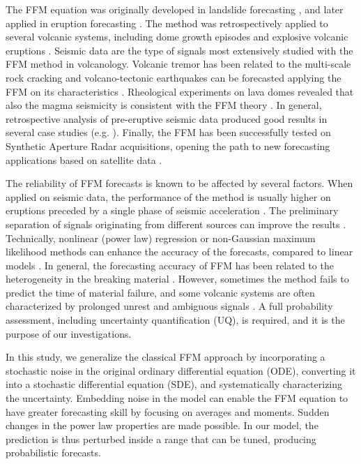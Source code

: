 \documentclass{article}
\begin{document}
The FFM equation was originally developed in landslide forecasting \citep{Fukuzuno1985, Voight1987, Voight1988b, Voight1989b}, and later applied in eruption forecasting \citep{Voight1988, Voight1989, Cornelius1995}. The method was retrospectively applied to several volcanic systems, including dome growth episodes and explosive volcanic eruptions \citep{Voight1991, Cornelius1994, Cornelius1996, Voight2000}. Seismic data are the type of signals most extensively studied with the FFM method in volcanology. Volcanic tremor has been related to the multi-scale rock cracking \citep{Kilburn1998,Ortiz2003,Kilburn2003,Smith2009} and volcano-tectonic earthquakes can be forecasted applying the FFM on its characteristics \citep{Tarraga2006}. Rheological experiments on lava domes revealed that also the magma seismicity is consistent with the FFM theory \citep{Lavallee2008}. In general, retrospective analysis of pre-eruptive seismic data produced good results in several case studies (e.g. \cite{Smith2010, Budi2013, Chardot2013}). Finally, the FFM has been successfully tested on Synthetic Aperture Radar acquisitions, opening the path to new forecasting applications based on satellite data \citep{Moretto2016}.

The reliability of FFM forecasts is known to be affected by several factors. When applied on seismic data, the performance of the method is usually higher on eruptions preceded by a single phase of seismic acceleration \citep{Boue2015}. The preliminary separation of signals originating from different sources can improve the results \citep{Salvage2016, Salvage2017}. Technically, nonlinear (power law) regression or non-Gaussian maximum likelihood methods can enhance the accuracy of the forecasts, compared to linear models \citep{Bell2011, Bell2013}. In general, the forecasting accuracy of FFM has been related to the heterogeneity in the breaking material \citep{Vasseur2015}. However, sometimes the method fails to predict the time of material failure, and some volcanic systems are often characterized by prolonged unrest and ambiguous signals \citep{Chiodini2016}. A full probability assessment, including uncertainty quantification (UQ), is required, and it is the purpose of our investigations.

In this study, we generalize the classical FFM approach by incorporating a stochastic noise in the original ordinary differential equation (ODE), converting it into a stochastic differential equation (SDE), and systematically characterizing the uncertainty. Embedding noise in the model can enable the FFM equation to have greater forecasting skill by focusing on averages and moments. Sudden changes in the power law properties are made possible. In our model, the prediction is thus perturbed inside a range that can be tuned, producing probabilistic forecasts. 
\end{document}
